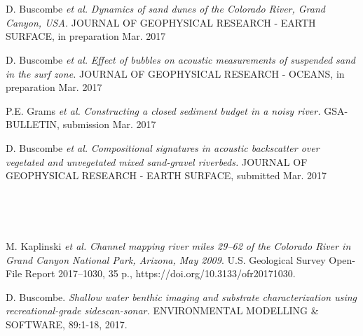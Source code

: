 \documentclass{article} %
\def\sf{\sffamily}
\def\sl{\slshape}
\newlength\sidebarwidth
\newcommand{\subtopic}[3][]
	 {\begin{minipage}{\textwidth}
	 \vspace*{.4\baselineskip}
         \nopagebreak\hspace{0in}%
         \nopagebreak\begin{minipage}[t]{\sidebarwidth - .2cm}
         \raggedleft {\sf\fontseries{sbc}\selectfont #2}
         {\\[-0.2\baselineskip] \textcolor{gray}{\footnotesize #1}}
	 \end{minipage}%
	 \hfill
	 \begin{minipage}[t]{\linewidth - \sidebarwidth}
	 #3%
	 \end{minipage}%
	 \vspace*{.2\baselineskip plus 1\baselineskip minus
	 .2\baselineskip}%
	 \end{minipage}}
\begin{document}
\subtopic{\hspace*{-3ex} Forthcoming}{~
  \begin{itemize}[leftmargin=0ex, itemsep=0ex, parsep=.5ex, labelindent=-4ex]

    \publication
      D. Buscombe {\sl et al.}
      {\sl Dynamics of sand dunes of the Colorado River, Grand Canyon, USA.}
      JOURNAL OF GEOPHYSICAL RESEARCH - EARTH SURFACE, in preparation Mar. 2017

    \publication
      D. Buscombe {\sl et al.}
      {\sl Effect of bubbles on acoustic measurements of suspended sand in the surf zone.}
      JOURNAL OF GEOPHYSICAL RESEARCH - OCEANS, in preparation Mar. 2017

    \publication
      P.E. Grams {\sl et al.}
      {\sl Constructing a closed sediment budget in a noisy river.}
      GSA-BULLETIN, submission Mar. 2017

    \publication
      D. Buscombe {\sl et al.}
      {\sl Compositional signatures in acoustic backscatter over vegetated and unvegetated mixed sand-gravel riverbeds.} 
      JOURNAL OF GEOPHYSICAL RESEARCH - EARTH SURFACE, submitted Mar. 2017

    \end{itemize}
}

\subtopic{\hspace*{-3ex} 2017}{~
  \begin{itemize}[leftmargin=0ex, itemsep=0ex, parsep=.5ex, labelindent=-4ex]

    \publication
      M. Kaplinski {\sl et al.}
      {\sl Channel mapping river miles 29–62 of the Colorado River in Grand Canyon National Park, Arizona, May 2009}.
      U.S. Geological Survey Open-File Report 2017–1030, 35 p., https://doi.org/10.3133/ofr20171030.

    \publication
      D. Buscombe.
      {\sl Shallow water benthic imaging and substrate characterization using recreational-grade sidescan-sonar.}
      ENVIRONMENTAL MODELLING \& SOFTWARE, 89:1-18, 2017.

    \end{itemize}
}
\end{document}
